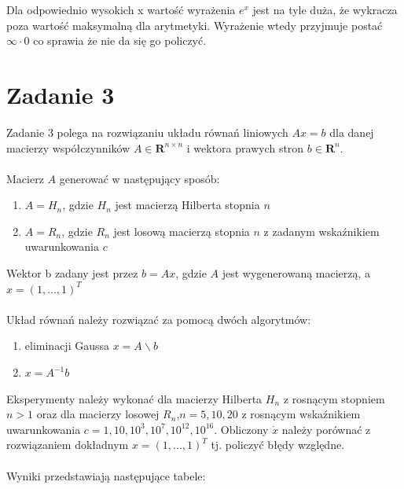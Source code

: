 \documentclass[12pt]{article}
\begin{document}
Dla odpowiednio wysokich x wartość wyrażenia $e^x$ jest na tyle duża, że wykracza poza wartość maksymalną dla arytmetyki. Wyrażenie wtedy przyjmuje postać $\infty \cdot 0$ co sprawia że nie da się go policzyć. 

\section{Zadanie 3}
Zadanie 3 polega na rozwiązaniu układu równań liniowych $Ax = b$ dla danej macierzy współczynników $A \in \mathbf{R}^{n \times n}$ i wektora prawych stron $b \in\mathbf{R}^{n} $.
\\
\\
\noindent Macierz $A$ generować w następujący sposób:
\begin{enumerate}
	\item{$A = H_n$, gdzie $H_n$ jest macierzą Hilberta stopnia $n$}
	\item{$A = R_n$, gdzie $R_n$ jest losową macierzą stopnia $n$ z zadanym wskaźnikiem uwarunkowania $c$}
\end{enumerate}

\noindent Wektor b zadany jest przez $b=Ax$, gdzie $A$ jest wygenerowaną macierzą, a $x = (1, ..., 1)^T$
\\
\\
\noindent Układ równań należy rozwiązać za pomocą dwóch algorytmów:
\begin{enumerate}
	\item{eliminacji Gaussa $x=A \backslash b$}
	\item{$x = A^{-1}b$}
\end{enumerate}

\noindent Eksperymenty należy wykonać dla macierzy Hilberta $H_n$ z rosnącym stopniem $n > 1$ oraz dla macierzy losowej $R_n$,$n= 5, 10, 20$ z rosnącym wskaźnikiem uwarunkowania $c = 1, 10, 10^3, 10^7, 10^{12}, 10^{16}$. Obliczony $\dot x$ należy porównać z rozwiązaniem dokładnym $x = (1, ..., 1)^T$ tj. policzyć błędy względne.
\\
\\
\noindent Wyniki przedstawiają następujące tabele:
\end{document}
